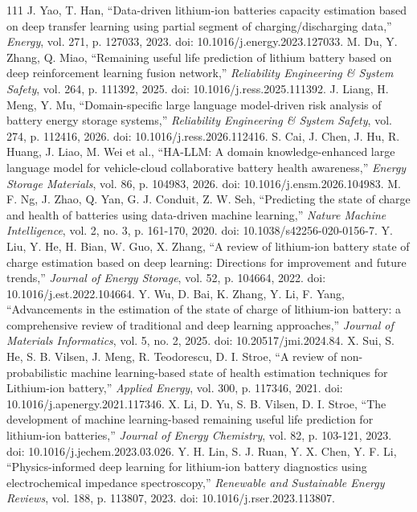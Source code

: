 \documentclass[journal]{IEEEtran}
\begin{document}
\begin{thebibliography}{111}
J. Yao, T. Han, ``Data-driven lithium-ion batteries capacity estimation based on deep transfer learning using partial segment of charging/discharging data,'' \emph{Energy}, vol. 271, p. 127033, 2023. doi: 10.1016/j.energy.2023.127033.
M. Du, Y. Zhang, Q. Miao, ``Remaining useful life prediction of lithium battery based on deep reinforcement learning fusion network,'' \emph{Reliability Engineering \& System Safety}, vol. 264, p. 111392, 2025. doi: 10.1016/j.ress.2025.111392.
J. Liang, H. Meng, Y. Mu, ``Domain-specific large language model-driven risk analysis of battery energy storage systems,'' \emph{Reliability Engineering \& System Safety}, vol. 274, p. 112416, 2026. doi: 10.1016/j.ress.2026.112416.
S. Cai, J. Chen, J. Hu, R. Huang, J. Liao, M. Wei et al., ``HA-LLM: A domain knowledge-enhanced large language model for vehicle-cloud collaborative battery health awareness,'' \emph{Energy Storage Materials}, vol. 86, p. 104983, 2026. doi: 10.1016/j.ensm.2026.104983.
M. F. Ng, J. Zhao, Q. Yan, G. J. Conduit, Z. W. Seh, ``Predicting the state of charge and health of batteries using data-driven machine learning,'' \emph{Nature Machine Intelligence}, vol. 2, no. 3, p. 161-170, 2020. doi: 10.1038/s42256-020-0156-7.
Y. Liu, Y. He, H. Bian, W. Guo, X. Zhang, ``A review of lithium-ion battery state of charge estimation based on deep learning: Directions for improvement and future trends,'' \emph{Journal of Energy Storage}, vol. 52, p. 104664, 2022. doi: 10.1016/j.est.2022.104664.
Y. Wu, D. Bai, K. Zhang, Y. Li, F. Yang, ``Advancements in the estimation of the state of charge of lithium-ion battery: a comprehensive review of traditional and deep learning approaches,'' \emph{Journal of Materials Informatics}, vol. 5, no. 2, 2025. doi: 10.20517/jmi.2024.84.
X. Sui, S. He, S. B. Vilsen, J. Meng, R. Teodorescu, D. I. Stroe, ``A review of non-probabilistic machine learning-based state of health estimation techniques for Lithium-ion battery,'' \emph{Applied Energy}, vol. 300, p. 117346, 2021. doi: 10.1016/j.apenergy.2021.117346.
X. Li, D. Yu, S. B. Vilsen, D. I. Stroe, ``The development of machine learning-based remaining useful life prediction for lithium-ion batteries,'' \emph{Journal of Energy Chemistry}, vol. 82, p. 103-121, 2023. doi: 10.1016/j.jechem.2023.03.026.
Y. H. Lin, S. J. Ruan, Y. X. Chen, Y. F. Li, ``Physics-informed deep learning for lithium-ion battery diagnostics using electrochemical impedance spectroscopy,'' \emph{Renewable and Sustainable Energy Reviews}, vol. 188, p. 113807, 2023. doi: 10.1016/j.rser.2023.113807.

\end{thebibliography}
\end{document}
